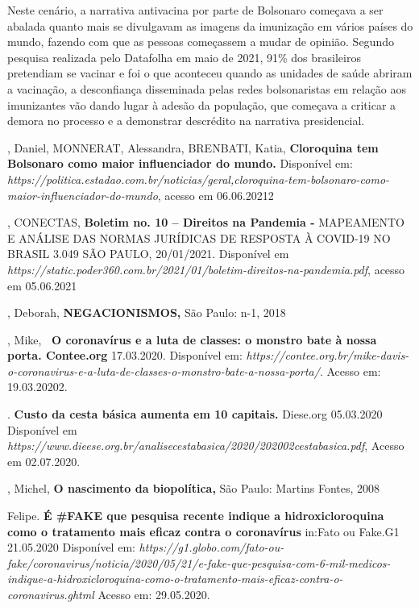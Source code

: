 Neste cenário, a narrativa antivacina por parte de Bolsonaro começava a
ser abalada quanto mais se divulgavam as imagens da imunização em vários
países do mundo, fazendo com que as pessoas começassem a mudar de
opinião. Segundo pesquisa realizada pelo Datafolha em maio de 2021, 91\%
dos brasileiros pretendiam se vacinar e foi o que aconteceu quando as
unidades de saúde abriram a vacinação, a desconfiança disseminada pelas
redes bolsonaristas em relação aos imunizantes vão dando lugar à adesão
da população, que começava a criticar a demora no processo e a
demonstrar descrédito na narrativa presidencial.

\begin{bibliohedra}
, Daniel, MONNERAT, Alessandra, BRENBATI, Katia,
\textbf{Cloroquina tem Bolsonaro como maior influenciador do mundo.}
Disponível em:
\emph{https://politica.estadao.com.br/noticias/geral,cloroquina-tem-bolsonaro-como-maior-influenciador-do-mundo},
acesso em 06.06.20212

, CONECTAS, \textbf{Boletim no. 10 -- Direitos na Pandemia -}
MAPEAMENTO E ANÁLISE DAS NORMAS JURÍDICAS DE RESPOSTA À COVID-19 NO
BRASIL 3.049 SÃO PAULO, 20/01/2021. Disponível em
\emph{https://static.poder360.com.br/2021/01/boletim-direitos-na-pandemia.pdf},
acesso em 05.06.2021

, Deborah, \textbf{NEGACIONISMOS,} São Paulo: n-1, 2018

, Mike, \textbf{~O coronavírus e a luta de classes: o monstro bate
à nossa porta. Contee.org} 17.03.2020. Disponível em:
\emph{https://contee.org.br/mike-davis-o-coronavirus-e-a-luta-de-classes-o-monstro-bate-a-nossa-porta/}.
Acesso em: 19.03.20202.

. \textbf{Custo da cesta básica aumenta em 10 capitais.} Diese.org
05.03.2020 Disponível em
\emph{https://www.dieese.org.br/analisecestabasica/2020/202002cestabasica.pdf},
Acesso em 02.07.2020.

, Michel, \textbf{O nascimento da biopolítica,} São Paulo:
Martins Fontes, 2008

 Felipe. \textbf{É \#FAKE que pesquisa recente indique a
hidroxicloroquina como o tratamento mais eficaz contra o coronavírus}
in:Fato ou Fake.G1 21.05.2020 Disponível em:
\emph{https://g1.globo.com/fato-ou-fake/coronavirus/noticia/2020/05/21/e-fake-que-pesquisa-com-6-mil-medicos-indique-a-hidroxicloroquina-como-o-tratamento-mais-eficaz-contra-o-coronavirus.ghtml}
Acesso em: 29.05.2020.


\end{bibliohedra}
